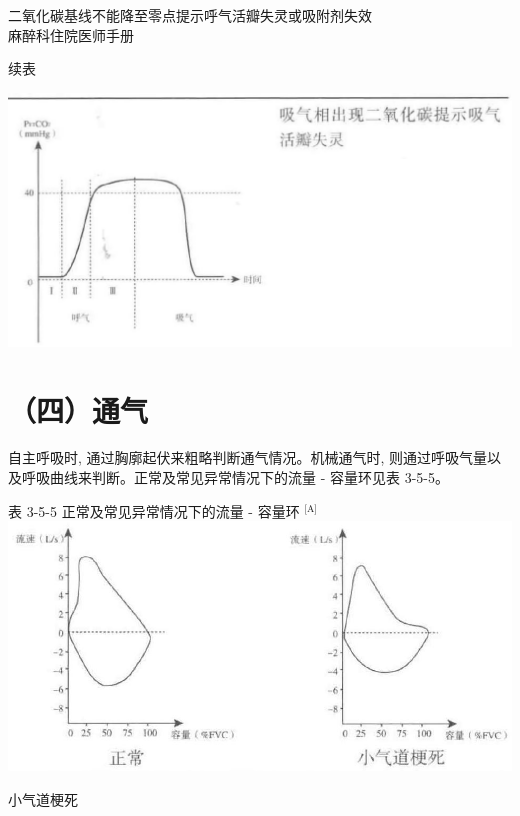 \documentclass[10pt]{article}
\begin{document}
二氧化碳基线不能降至零点提示呼气活瓣失灵或吸附剂失效\\
麻醉科住院医师手册

续表

\begin{center}
\includegraphics[max width=\textwidth]{2024_07_05_645bb794a4d4f32ee0c8g-100(1)}
\end{center}

\section*{（四）通气}
自主呼吸时, 通过胸廓起伏来粗略判断通气情况。机械通气时, 则通过呼吸气量以及呼吸曲线来判断。正常及常见异常情况下的流量 - 容量环见表 3-5-5。

表 3-5-5 正常及常见异常情况下的流量 - 容量环 ${ }^{\text {[A] }}$\\
\includegraphics[max width=\textwidth, center]{2024_07_05_645bb794a4d4f32ee0c8g-100}

小气道梗死
\end{document}
